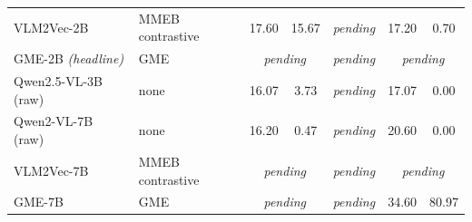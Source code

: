 \begin{table}[t]
\begin{tabular}{llcccccc}
VLM2Vec-2B             & MMEB contrastive & 17.60 & 15.67 & \multicolumn{2}{c}{\emph{pending}} & 17.20 & 0.70 \\
GME-2B \emph{(headline)} & GME            & \multicolumn{2}{c}{\emph{pending}} & \multicolumn{2}{c}{\emph{pending}} & \multicolumn{2}{c}{\emph{pending}} \\
\midrule
Qwen2.5-VL-3B (raw)    & none             & 16.07 & 3.73 & \multicolumn{2}{c}{\emph{pending}} & 17.07 & 0.00 \\
Qwen2-VL-7B (raw)      & none             & 16.20 & 0.47 & \multicolumn{2}{c}{\emph{pending}} & 20.60 & 0.00 \\
VLM2Vec-7B             & MMEB contrastive & \multicolumn{2}{c}{\emph{pending}} & \multicolumn{2}{c}{\emph{pending}} & \multicolumn{2}{c}{\emph{pending}} \\
GME-7B                 & GME              & \multicolumn{2}{c}{\emph{pending}} & \multicolumn{2}{c}{\emph{pending}} & 34.60 & 80.97 \\
\bottomrule
\end{tabular}
\end{table}

%
%

